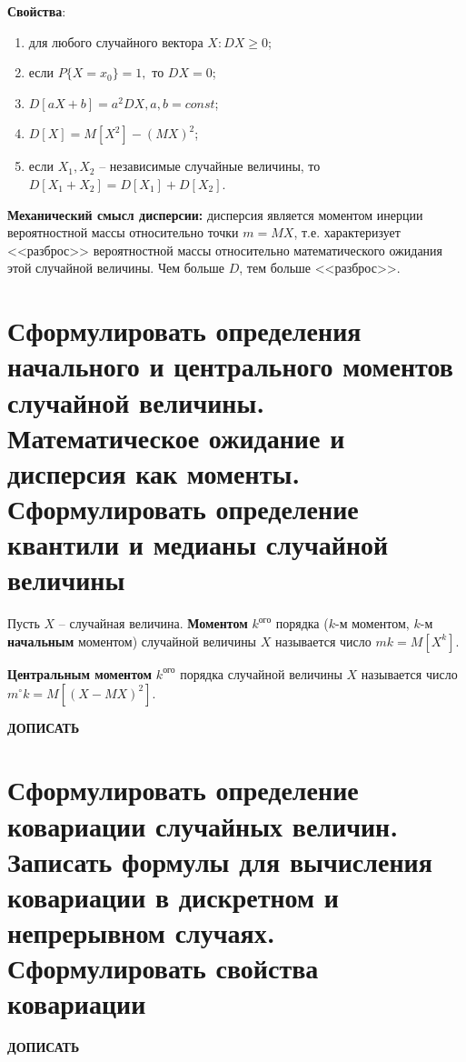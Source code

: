 \textbf{Свойства}:
\begin{enumerate}
	\item для любого случайного вектора $X: DX \geq 0$;
	\item если $P\{X=x_0\} = 1,$ то $DX = 0$;
	\item $D[aX+b] = a^2DX,      a, b = const$;
	\item $D[X] = M[X^2] - (MX)^2$;
	\item если $X_1, X_2$ -- независимые случайные величины, то $D[X_1 + X_2] = D[X_1] + D[X_2]$.
\end{enumerate}

\textbf{Механический смысл дисперсии:} дисперсия является моментом инерции вероятностной массы относительно точки $m=MX$, т.е. характеризует <<разброс>> вероятностной массы относительно математического ожидания этой случайной величины. Чем больше $D$, тем больше <<разброс>>.

\section{Сформулировать определения начального и центрального моментов случайной величины. Математическое ожидание и дисперсия как моменты. Сформулировать определение квантили и медианы случайной величины}

Пусть $X$ -- случайная величина. \textbf{Моментом} $k^{\text{ого}}$ порядка ($k$-м моментом, $k$-м \textbf{начальным} моментом) случайной величины $X$ называется число $mk = M[X^k]$.

\textbf{Центральным моментом} $k^{\text{ого}}$ порядка случайной величины $X$ называется число $m^\circ k = M[(X-MX)^2]$.

\textbf{ДОПИСАТЬ}

\section{Сформулировать определение ковариации случайных величин. Записать формулы для вычисления ковариации в дискретном и непрерывном случаях. Сформулировать свойства ковариации}

\textbf{ДОПИСАТЬ}